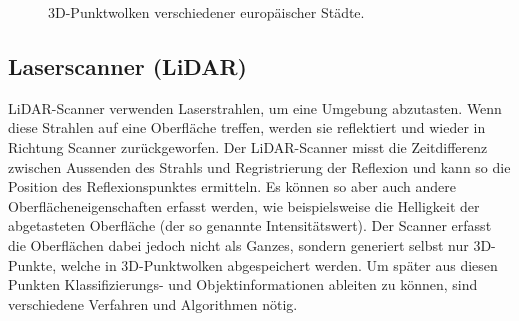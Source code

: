 \begin{figure}
    \hfill
    \hfill
    \caption{3D-Punktwolken verschiedener europäischer Städte.}
    \label{fig:example_pcs}
\end{figure}

\subsection*{Laserscanner (LiDAR)}
LiDAR-Scanner \citep{Collis-1970} verwenden Laserstrahlen, um eine Umgebung abzutasten. Wenn diese Strahlen auf eine Oberfläche treffen, werden sie reflektiert und wieder in Richtung Scanner zurückgeworfen. Der LiDAR-Scanner misst die Zeitdifferenz zwischen Aussenden des Strahls und Regristrierung der Reflexion und kann so die Position des Reflexionspunktes ermitteln. Es können so aber auch andere Oberflächeneigenschaften erfasst werden, wie beispielsweise die Helligkeit der abgetasteten Oberfläche (der so genannte Intensitätswert). Der Scanner erfasst die Oberflächen dabei jedoch nicht als Ganzes, sondern generiert selbst nur 3D-Punkte, welche in 3D-Punktwolken abgespeichert werden. Um später aus diesen Punkten Klassifizierungs- und Objektinformationen ableiten zu können, sind verschiedene Verfahren und Algorithmen nötig.

